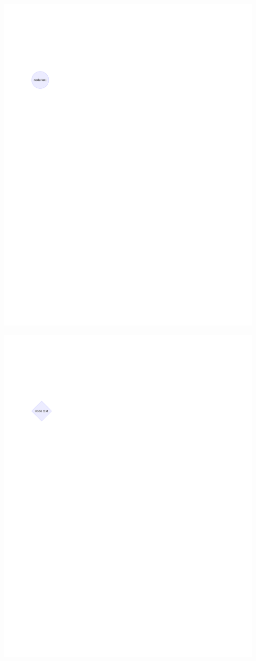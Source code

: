 \documentclass[
  letterpaper,
]{scrbook}
\begin{document}
\includegraphics{./summary_files/figure-pdf/unnamed-chunk-4-3.pdf}

\includegraphics{./summary_files/figure-pdf/unnamed-chunk-4-4.pdf}
\end{document}
